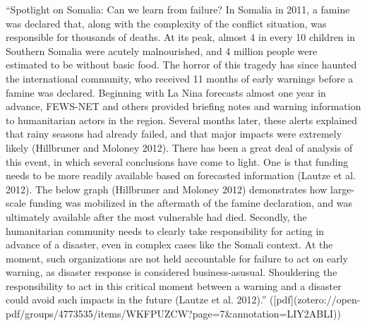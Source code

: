 “Spotlight on Somalia: Can we learn from failure? In Somalia in 2011, a famine was declared that, along with the complexity of the conflict situation, was responsible for thousands of deaths. At its peak, almost 4 in every 10 children in Southern Somalia were acutely malnourished, and 4 million people were estimated to be without basic food. The horror of this tragedy has since haunted the international community, who received 11 months of early warnings before a famine was declared. Beginning with La Nina forecasts almost one year in advance, FEWS-NET and others provided briefing notes and warning information to humanitarian actors in the region. Several months later, these alerts explained that rainy seasons had already failed, and that major impacts were extremely likely (Hillbruner and Moloney 2012). There has been a great deal of analysis of this event, in which several conclusions have come to light. One is that funding needs to be more readily available based on forecasted information (Lautze et al. 2012). The below graph (Hillbruner and Moloney 2012) demonstrates how large-scale funding was mobilized in the aftermath of the famine declaration, and was ultimately available after the most vulnerable had died. Secondly, the humanitarian community needs to clearly take responsibility for acting in advance of a disaster, even in complex cases like the Somali context. At the moment, such organizations are not held accountable for failure to act on early warning, as disaster response is considered business-asusual. Shouldering the responsibility to act in this critical moment between a warning and a disaster could avoid such impacts in the future (Lautze et al. 2012).” ([pdf](zotero://open-pdf/groups/4773535/items/WKFPUZCW?page=7&annotation=LIY2ABLI))


